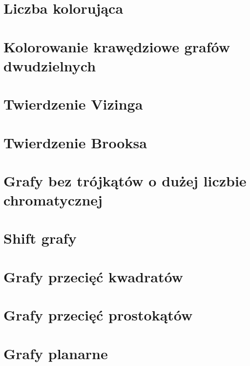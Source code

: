 \section{Liczba kolorująca}


\section{Kolorowanie krawędziowe grafów dwudzielnych}


\section{Twierdzenie Vizinga}


\section{Twierdzenie Brooksa}


\section{Grafy bez trójkątów o dużej liczbie chromatycznej}


\section{Shift grafy}


\section{Grafy przecięć kwadratów}




\section{Grafy przecięć prostokątów}



\section{Grafy planarne}

